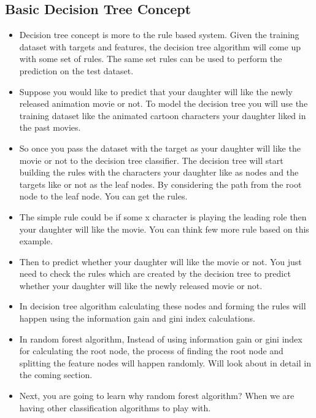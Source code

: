 \documentclass[a4paper,12pt]{article}
\begin{document}
\subsection*{Basic Decision Tree Concept}
\begin{itemize}
	\item Decision tree concept is more to the rule based system. Given the training dataset with targets and features, the decision tree algorithm will come up with some set of rules. The same set rules can be used to perform the prediction on the test dataset.
	
\item Suppose you would like to predict that your daughter will like the newly released animation movie or not. To model the decision tree you will use the training dataset like the animated cartoon characters your daughter liked in the past movies.
	
\item So once you pass the dataset with the target as your daughter will like the movie or not to the decision tree classifier. The decision tree will start building the rules with the characters your daughter like as nodes and the targets like or not as the leaf nodes. By considering the path from the root node to the leaf node. You can get the rules.
	
\item The simple rule could be if some x character is playing the leading role then your daughter will like the movie. You can think few more rule based on this example.
	
\item Then to predict whether your daughter will like the movie or not. You just need to check the rules which are created by the decision tree to predict whether your daughter will like the newly released movie or not.
\item In decision tree algorithm calculating these nodes and forming the rules will happen using the information gain and gini index calculations.

\item In random forest algorithm, Instead of using information gain or gini index for calculating the root node, the process of finding the root node and splitting the feature nodes will happen randomly. Will look about in detail in the coming section.

\item Next, you are going to learn why random forest algorithm? When we are having other classification algorithms to play with.
\end{itemize}
\end{document}

